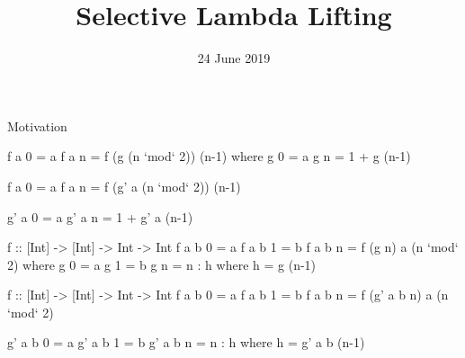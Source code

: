 \documentclass{haskellbeamer}
\title{Selective Lambda Lifting}
\date{24 June 2019}
\begin{document}
\maketitle

\begin{frame}[fragile]{Motivation}
  \begin{center}
    \begin{minipage}{0.7\textwidth}
      \begin{overprint}
        \begin{haskell}
          f a 0 = a
          f a n = f (g (n `mod` 2)) (n-1)
            where
              g 0 = a
              g n = 1 + g (n-1)
        \end{haskell}
        \begin{haskell}
          f a 0 = a
          f a n = f (g' a (n `mod` 2)) (n-1)

          g' a 0 = a
          g' a n = 1 + g' a (n-1)
        \end{haskell}
        \begin{haskell}
f :: [Int] -> [Int] -> Int -> Int
f a b 0 = a
f a b 1 = b
f a b n = f (g n) a (n `mod` 2)
  where
    g 0 = a
    g 1 = b
    g n = n : h
      where
        h = g (n-1)
        \end{haskell}
        \begin{haskell}
f :: [Int] -> [Int] -> Int -> Int
f a b 0 = a
f a b 1 = b
f a b n = f (g' a b n) a (n `mod` 2)

g' a b 0 = a
g' a b 1 = b
g' a b n = n : h
  where
    h = g' a b (n-1)
        \end{haskell}

      \end{overprint}
    \end{minipage}
  \end{center}
\end{frame}
\end{document}

